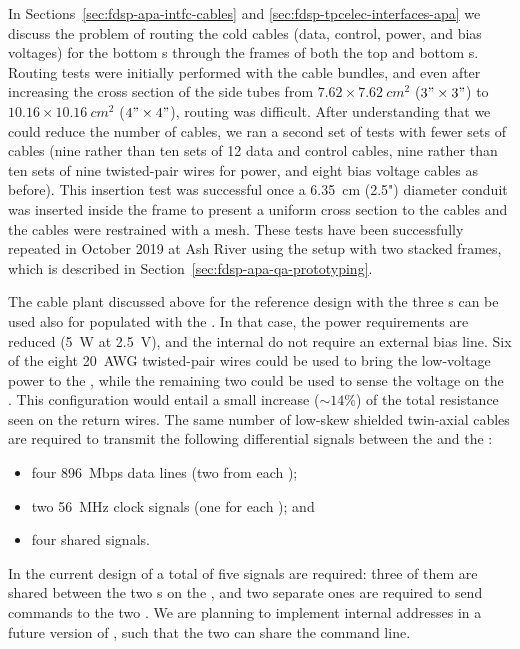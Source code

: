 In Sections~\ref{sec:fdsp-apa-intfc-cables} and \ref{sec:fdsp-tpcelec-interfaces-apa}
we discuss the problem of routing the cold cables (data, control, power, and
bias voltages) for the bottom s through the frames of both
the top and bottom s. Routing tests were initially performed
with the  cable bundles, and even after increasing
the cross section of the side tubes from $\num{7.62}\times\SI{7.62}{cm^2}$ ($3"\times3"$)
to $\num{10.16}\times\SI{10.16}{cm^2}$ ($4"\times4"$), routing was difficult. After understanding that we
could reduce the number of cables, we ran a second set of tests with fewer sets
of cables (nine rather than ten sets of 12 data and control cables, nine rather than
ten sets of nine twisted-pair wires for power, and eight bias voltage cables as before).
This insertion test was successful once
a \SI{6.35}{cm} (2.5") diameter conduit was inserted inside the
 frame to present a uniform cross section to
the cables and the cables were restrained with a mesh. These tests have been
successfully repeated in October 2019 at Ash River using the setup with 
two stacked  frames, which is described in Section~\ref{sec:fdsp-apa-qa-prototyping}.

The cable plant discussed above for the reference design with the three s
can be used also for  populated with the
 . In that case, the power requirements are 
reduced (\SI{5}{W} at \SI{2.5}{V}), and the internal  do
not require an external bias line. Six of the eight \SI{20}{AWG} twisted-pair
wires could be used to bring the low-voltage power to the ,
while the remaining two could be used to sense the voltage on the .
This configuration would entail a small increase ($\sim14$\%) of the 
total resistance seen on the return wires. The same number of low-skew shielded
twin-axial cables are required to transmit the following differential signals
between the  and the :
\begin{itemize}
\item four \SI{896}{Mbps} data lines (two from each  );
\item two \SI{56}{MHz} clock signals (one for each  ); and
\item four shared  signals.
\end{itemize}
In the current design of   a total of five  signals
are required: three of them are shared between the two s on the
, and two separate ones are required to send commands to the
two  . We are planning to implement internal 
addresses in a future version of , such that the two 
can share the command line.


